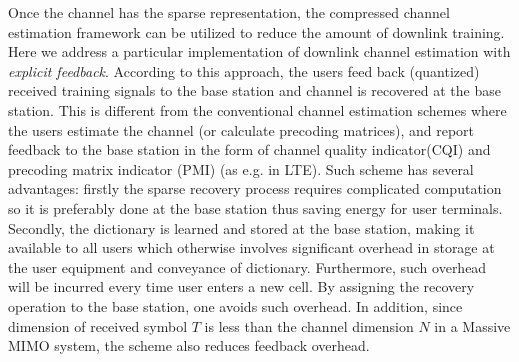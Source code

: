 Once the channel has the sparse representation, the compressed
channel estimation framework can be utilized to reduce the amount of downlink training. Here we address a particular implementation of downlink channel estimation with \textit{explicit feedback}. According to this approach, the users feed back (quantized) received training signals to the base station and channel is recovered at the base station. This is different from the conventional channel estimation schemes where the users estimate the channel (or calculate precoding matrices), and report feedback to the base station in the form of channel quality indicator(CQI) and precoding matrix indicator (PMI) (as e.g. in LTE). Such scheme has several advantages: firstly the sparse recovery process requires complicated computation so it is preferably done at the base station thus saving energy for user terminals. Secondly, the dictionary is learned and stored at the base station, making it available to all users which otherwise involves significant overhead in storage at the user equipment and conveyance of dictionary. Furthermore, such overhead will be incurred every time user enters a new cell. By assigning the recovery operation to the base station, one avoids such overhead. In addition, since dimension of received symbol $T$ is less than the channel dimension $N$ in a Massive MIMO system, the scheme also reduces feedback overhead. 








